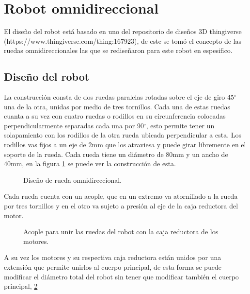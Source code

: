 \documentclass{iccmemoria}
\begin{document}
\section{Robot omnidireccional}

El diseño del robot está basado en uno del repositorio de diseños 3D thingiverse (https://www.thingiverse.com/thing:167923), de este se tomó el concepto de las ruedas omnidireccionales las que se rediseñaron para este robot en espesifico.\\

\subsection{Diseño del robot}

La construcción consta de dos ruedas paralelas rotadas sobre el eje de giro 45$^{\circ}$ una de la otra, unidas por medio de tres tornillos. Cada una de estas ruedas cuanta a su vez con cuatro ruedas o rodillos en su circunferencia colocadas perpendicularmente separadas cada una por 90$^{\circ}$, esto permite tener un solapamiento con los rodillos de la otra rueda ubicada perpendicular a esta. Los rodillos vas fijos a un eje de 2mm que los atraviesa y puede girar libremente en el soporte de la rueda. Cada rueda tiene un diámetro de 80mm y un ancho de 40mm, en la figura \ref{fig:image_omni_whell_2} se puede ver la construcción de esta.\\

\begin{figure}[H]
  \centering
  
  \caption[Rueda omnidireccional.]{Diseño de rueda omnidireccional.}
  \label{fig:image_omni_whell_2}
\end{figure}

Cada rueda cuenta con un acople, que en un extremo va atornillado a la rueda por tres tornillos y en el otro va sujeto a presión al eje de la caja reductora del motor.\\

\begin{figure}[H]
  \centering
  
  \caption[Acople entre la rueda y la caja reductora.]{Acople para unir las ruedas del robot con la caja reductora de los motores.}
  \label{fig:arm}
\end{figure}

A su vez los motores y su respectiva caja reductora están unidos por una extensión que permite unirlos al cuerpo principal, de esta forma se puede modificar el diámetro total del robot sin tener que modificar también el cuerpo principal, \ref{fig:arm}\\
\end{document}

